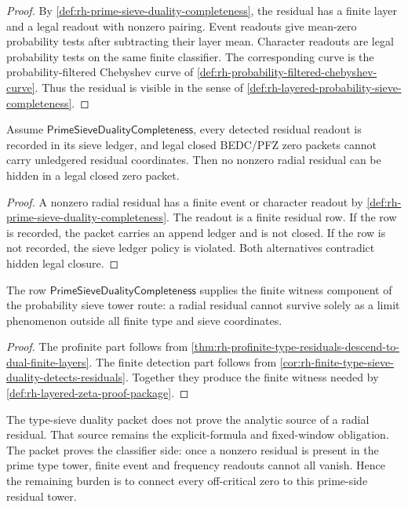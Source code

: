 \begin{proof}
By \autoref{def:rh-prime-sieve-duality-completeness}, the residual has
a finite layer and a legal readout with nonzero pairing.  Event readouts
give mean-zero probability tests after subtracting their layer mean.
Character readouts are legal probability tests on the same finite
classifier.  The corresponding curve is the
probability-filtered Chebyshev curve of
\autoref{def:rh-probability-filtered-chebyshev-curve}.  Thus the
residual is visible in the sense of
\autoref{def:rh-layered-probability-sieve-completeness}.
\end{proof}

\begin{theorem}
\label{thm:rh-duality-complete-sieve-excludes-hidden-radial-residuals}
Assume $\mathsf{PrimeSieveDualityCompleteness}$, every detected
residual readout is recorded in its sieve ledger, and legal closed
BEDC/PFZ zero packets cannot carry unledgered residual coordinates.
Then no nonzero radial residual can be hidden in a legal closed zero
packet.
\end{theorem}

\begin{proof}
A nonzero radial residual has a finite event or character readout by
\autoref{def:rh-prime-sieve-duality-completeness}.  The readout is a
finite residual row.  If the row is recorded, the packet carries an
append ledger and is not closed.  If the row is not recorded, the sieve
ledger policy is violated.  Both alternatives contradict hidden legal
closure.
\end{proof}

\begin{corollary}
\label{cor:rh-duality-completeness-finite-witness-route}
The row $\mathsf{PrimeSieveDualityCompleteness}$ supplies the finite
witness component of the probability sieve tower route: a radial
residual cannot survive solely as a limit phenomenon outside all finite
type and sieve coordinates.
\end{corollary}

\begin{proof}
The profinite part follows from
\autoref{thm:rh-profinite-type-residuals-descend-to-dual-finite-layers}.
The finite detection part follows from
\autoref{cor:rh-finite-type-sieve-duality-detects-residuals}.  Together
they produce the finite witness needed by
\autoref{def:rh-layered-zeta-proof-package}.
\end{proof}

\begin{principle}
\label{prin:rh-prime-sieve-duality-audit-boundary}
The type-sieve duality packet does not prove the analytic source of a
radial residual.  That source remains the explicit-formula and
fixed-window obligation.  The packet proves the classifier side: once a
nonzero residual is present in the prime type tower, finite event and
frequency readouts cannot all vanish.  Hence the remaining burden is to
connect every off-critical zero to this prime-side residual tower.
\end{principle}
